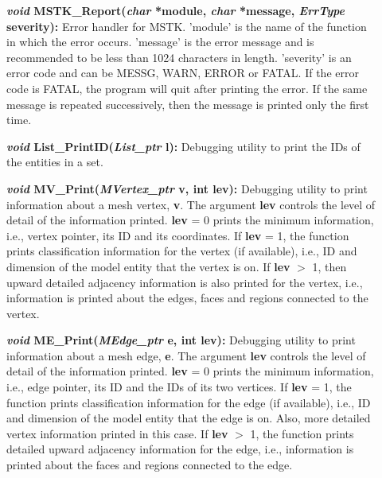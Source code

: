 \documentclass[12pt]{article}
\begin{document}
\begin{description}
  
\item[]\textbf{\textit{void} MSTK\_Report(\textit{char} *module,
  \textit{char} *message, \textit{ErrType} severity):} Error handler
  for MSTK. 'module' is the name of the function in which the error
  occurs. 'message' is the error message and is recommended to be less
  than 1024 characters in length. 'severity' is an error code and can
  be MESSG, WARN, ERROR or FATAL. If the error code is FATAL, the
  program will quit after printing the error. If the same message is
  repeated successively, then the message is printed only the first
  time.

\item[]\textbf{\textit{void} List\_PrintID(\textit{List\_ptr} l):} Debugging
utility to print the IDs of the entities in a set.

\item[]\textbf{\textit{void} MV\_Print(\textit{MVertex\_ptr} v, int
    lev):} Debugging utility to print information about a mesh vertex,
  \textbf{v}. The argument \textbf{lev} controls the level of detail
  of the information printed. \textbf{lev} = 0 prints the minimum
  information, i.e., vertex pointer, its ID and its coordinates. If
  \textbf{lev} = 1, the function prints classification information for
  the vertex (if available), i.e., ID and dimension of the model
  entity that the vertex is on. If \textbf{lev} $>$ 1, then upward
  detailed adjacency information is also printed for the vertex, i.e.,
  information is printed about the edges, faces and regions connected
  to the vertex.
  
\item[]\textbf{\textit{void} ME\_Print(\textit{MEdge\_ptr} e, int
    lev):} Debugging utility to print information about a mesh edge,
  \textbf{e}. The argument \textbf{lev} controls the level of detail
  of the information printed. \textbf{lev} = 0 prints the minimum
  information, i.e., edge pointer, its ID and the IDs of its two
  vertices. If \textbf{lev} = 1, the function prints classification
  information for the edge (if available), i.e., ID and dimension of
  the model entity that the edge is on. Also, more detailed vertex
  information printed in this case. If \textbf{lev} $>$ 1, the
  function prints detailed upward adjacency information for the edge,
  i.e., information is printed about the faces and regions connected
  to the edge.
    

\end{description}
\end{document}
